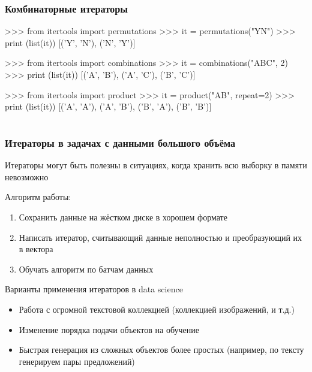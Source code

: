 \documentclass[fleqn, xcolor=x11names]{beamer}
\begin{document}
\begin{frame}[fragile]\frametitle{Комбинаторные итераторы}
\begin{pcode}
>>> from itertools import permutations
>>> it = permutations("YN")
>>> print (list(it))
[('Y', 'N'), ('N', 'Y')]
\end{pcode}

\hfill

\begin{pcode}
>>> from itertools import combinations
>>> it = combinations("ABC", 2)
>>> print (list(it))
[('A', 'B'), ('A', 'C'), ('B', 'C')]
\end{pcode}

\hfill

\begin{pcode}
>>> from itertools import product
>>> it = product("AB", repeat=2)
>>> print (list(it))
[('A', 'A'), ('A', 'B'), ('B', 'A'), ('B', 'B')]
\end{pcode}
\end{frame}

\section*{}

\begin{frame}[fragile]\frametitle{Итераторы в задачах с данными большого объёма}
Итераторы могут быть полезны в ситуациях, когда хранить всю выборку в памяти невозможно

\hfill

Алгоритм работы:
\begin{enumerate}
\item Сохранить данные на жёстком диске в хорошем формате
\item Написать итератор, считывающий данные неполностью и преобразующий их в вектора
\item Обучать алгоритм по батчам данных
\end{enumerate}

%
\end{frame}

\begin{frame}{Варианты применения итераторов в data science}
\begin{itemize}
    \item Работа с огромной текстовой коллекцией (коллекцией изображений, и т.д.)
    
    \item Изменение порядка подачи объектов на обучение
    
    \item Быстрая генерация из сложных объектов более простых (например, по тексту генерируем пары предложений)
\end{itemize}
\end{frame}
\end{document}
